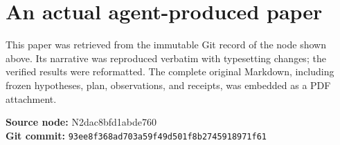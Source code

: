 \documentclass[11pt,a4paper]{article}
\begin{document}
\newpage
\appendix
\section{An actual agent-produced paper}\label{app:paper}
This paper was retrieved from the immutable Git record of the node shown above. Its narrative was reproduced verbatim with typesetting changes; the verified results were reformatted. The complete original Markdown, including frozen hypotheses, plan, observations, and receipts, was embedded as a PDF attachment.

{\small\color{muted}\textbf{Source node:} N2dac8bfd1abde760\\
\textbf{Git commit:} \nolinkurl{93ee8f368ad703a59f49d501f8b2745918971f61}}

\end{document}
